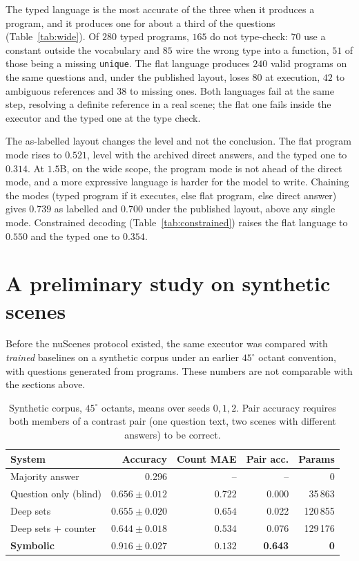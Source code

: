 \documentclass[11pt,a4paper]{article}
\newcommand{\code}[1]{\texttt{\small #1}}
\newcommand{\nr}{--}
\begin{document}
The typed language is the most accurate of the three when it produces a
program, and it produces one for about a third of the questions
(Table~\ref{tab:wide}). Of $280$ typed programs, $165$ do not type-check:
$70$ use a constant outside the vocabulary and $85$ wire the wrong type into
a function, $51$ of those being a missing \code{unique}. The flat language
produces $240$ valid programs on the same questions and, under the published
layout, loses $80$ at execution, $42$ to ambiguous references and $38$ to
missing ones. Both languages fail at the same step, resolving a definite
reference in a real scene; the flat one fails inside the executor and the
typed one at the type check.

The as-labelled layout changes the level and not the conclusion. The flat
program mode rises to $0.521$, level with the archived direct answers, and
the typed one to $0.314$. At $1.5$B, on the wide scope, the program mode is
not ahead of the direct mode, and a more expressive language is harder for
the model to write. Chaining the modes (typed program if it executes, else
flat program, else direct answer) gives $0.739$ as labelled and $0.700$
under the published layout, above any single mode. Constrained decoding
(Table~\ref{tab:constrained}) raises the flat language to $0.550$ and the
typed one to $0.354$.

\section{A preliminary study on synthetic scenes}
\label{sec:synthetic}

Before the nuScenes protocol existed, the same executor was compared with
\emph{trained} baselines on a synthetic corpus under an earlier $45^{\circ}$
octant convention, with questions generated from programs. These numbers are
not comparable with the sections above.

\begin{table}[ht]
\centering
\small
\begin{tabular}{lrrrr}
\toprule
System & Accuracy & Count MAE & Pair acc. & Params \\
\midrule
Majority answer          & 0.296 & \nr & \nr & 0 \\
Question only (blind)    & $0.656 \pm 0.012$ & $0.722$ & 0.000 & 35\,863 \\
Deep sets                & $0.655 \pm 0.020$ & $0.654$ & 0.022 & 120\,855 \\
Deep sets $+$ counter    & $0.644 \pm 0.018$ & $0.534$ & 0.076 & 129\,176 \\
\textbf{Symbolic}        & $\mathbf{0.916 \pm 0.027}$ & $\mathbf{0.132}$ & \textbf{0.643} & \textbf{0} \\
\bottomrule
\end{tabular}
\caption{Synthetic corpus, $45^{\circ}$ octants, means over seeds $0,1,2$.
Pair accuracy requires both members of a contrast pair (one question text,
two scenes with different answers) to be correct.}
\label{tab:synthetic}
\end{table}
\end{document}
